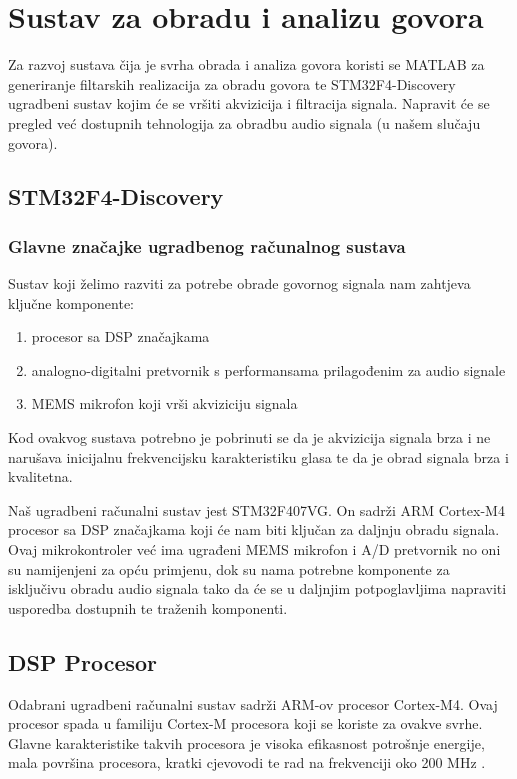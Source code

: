 \documentclass[times, utf8, diplomski]{fer}
\begin{document}
\chapter{Sustav za obradu i analizu govora}
Za razvoj sustava čija je svrha obrada i analiza govora koristi se MATLAB za generiranje filtarskih realizacija za obradu govora te STM32F4-Discovery ugradbeni sustav kojim će se vršiti akvizicija i filtracija signala. Napravit će se pregled već dostupnih tehnologija za obradbu audio signala (u našem slučaju govora).




\section{STM32F4-Discovery}

\subsection{Glavne značajke ugradbenog računalnog sustava}
Sustav koji želimo razviti za potrebe obrade govornog signala nam zahtjeva ključne komponente:

\begin{enumerate}
\item procesor sa DSP značajkama
\item analogno-digitalni pretvornik s performansama prilagođenim za audio signale
\item MEMS mikrofon koji vrši akviziciju signala
\end{enumerate}

Kod ovakvog sustava potrebno je pobrinuti se da je akvizicija signala brza i ne narušava inicijalnu frekvencijsku karakteristiku glasa te da je obrad signala brza i kvalitetna. 

Naš ugradbeni računalni sustav jest STM32F407VG. On sadrži ARM Cortex-M4 procesor sa DSP značajkama koji će nam biti ključan za daljnju obradu signala. Ovaj mikrokontroler već ima ugrađeni MEMS mikrofon i A/D pretvornik no oni su namijenjeni za opću primjenu, dok su nama potrebne komponente za isključivu obradu audio signala tako da će se u daljnjim potpoglavljima napraviti usporedba dostupnih te traženih komponenti.

\section{DSP Procesor}
\label{instr}
Odabrani ugradbeni računalni sustav sadrži ARM-ov procesor Cortex-M4. Ovaj procesor spada u familiju Cortex-M procesora koji se koriste za ovakve svrhe. Glavne karakteristike takvih procesora je visoka efikasnost potrošnje energije, mala površina procesora, kratki cjevovodi te rad na frekvenciji oko 200 MHz \citep{cortexm4}.
\end{document}
